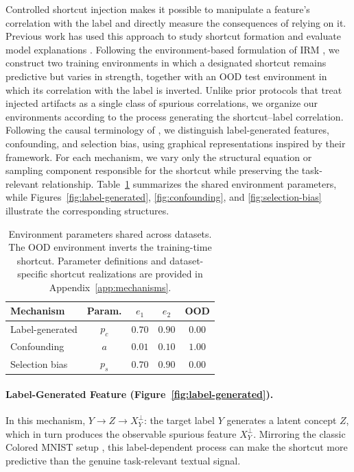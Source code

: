 \documentclass[11pt]{article}
\theoremstyle{definition}
\theoremstyle{plain}
\begin{document}
Controlled shortcut injection makes it possible to manipulate a feature's correlation with the label and directly measure the consequences of relying on it. Previous work has used this approach to study shortcut formation and evaluate model explanations \citep{bastings2022will, pezeshkpour2022combining}. Following the environment-based formulation of IRM \citep{arjovsky2019invariant}, we construct two training environments in which a designated shortcut remains predictive but varies in strength, together with an OOD test environment in which its correlation with the label is inverted. Unlike prior protocols that treat injected artifacts as a single class of spurious correlations, we organize our environments according to the process generating the shortcut--label correlation. Following the causal terminology of \citet{veitch2021counterfactual}, we distinguish label-generated features, confounding, and selection bias, using graphical representations inspired by their framework. For each mechanism, we vary only the structural equation or sampling component responsible for the shortcut while preserving the task-relevant relationship. Table~\ref{tab:params} summarizes the shared environment parameters, while Figures~\ref{fig:label-generated}, \ref{fig:confounding}, and \ref{fig:selection-bias} illustrate the corresponding structures.



\begin{table}[t]
\centering
\small
\renewcommand{\arraystretch}{1.15}
\setlength{\tabcolsep}{4pt}
\begin{tabular}{@{}lcccc@{}}
\toprule
\textbf{Mechanism} & \textbf{Param.} & \textbf{$e_1$} & \textbf{$e_2$} & \textbf{OOD} \\
\midrule
Label-generated & $p_c$ & $0.70$ & $0.90$ & $0.00$ \\
Confounding & $a$ & $0.01$ & $0.10$ & $1.00$ \\
Selection bias & $p_s$ & $0.70$ & $0.90$ & $0.00$ \\
\bottomrule
\end{tabular}
\caption{Environment parameters shared across datasets. The OOD environment inverts the training-time shortcut. Parameter definitions and dataset-specific shortcut realizations are provided in Appendix~\ref{app:mechanisms}.}
\label{tab:params}
\end{table}

\paragraph{Label-Generated Feature (Figure~\ref{fig:label-generated}).} In this mechanism, $Y \rightarrow Z \rightarrow X_Y^{\perp}$: the target label $Y$ generates a latent concept $Z$, which in turn produces the observable spurious feature $X_Y^{\perp}$. Mirroring the classic Colored MNIST setup \citet{arjovsky2019invariant}, this label-dependent process can make the shortcut more predictive than the genuine task-relevant textual signal.
\end{document}

